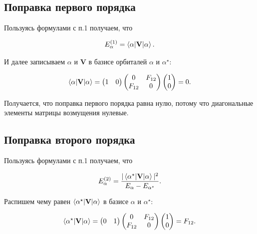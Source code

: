 \documentclass{article}
\begin{document}
\subsection{Поправка первого порядка}

Пользуясь формулами с п.1 получаем, что 

\begin{equation}
    E_{\alpha}^{(1)} = \braket{\alpha|\textbf{V}|\alpha}.
\end{equation}

И далее записываем $\alpha$ и $\textbf{V}$ в базисе орбиталей $\alpha$ и $\alpha^\star$:

\begin{equation}
    \braket{\alpha|\textbf{V}|\alpha} = 
    \begin{pmatrix}
        1 & 0
    \end{pmatrix}
    \begin{pmatrix}
        0 & F_{12} \\
        F_{12} & 0
    \end{pmatrix}
    \begin{pmatrix}
        1 \\
        0
    \end{pmatrix}
    = 0.
\end{equation}

Получается, что поправка первого порядка равна нулю, потому что диагональные элементы матрицы возмущения нулевые.

\subsection{Поправка второго порядка}

Пользуясь формулами с п.1 получаем, что 

\begin{equation}
    E_{\alpha}^{(2)} = \frac{|\braket{\alpha^{\star}|\textbf{V}|\alpha}|^2}{E_{\alpha} - E_{\alpha^{\star}}}.
\end{equation}

Распишем чему равен $\braket{\alpha^{\star}|\textbf{V}|\alpha}$ в базисе $\alpha$ и $\alpha^\star$:

\begin{equation}
    \braket{\alpha^{\star}|\textbf{V}|\alpha} = 
    \begin{pmatrix}
        0 & 1
    \end{pmatrix}
    \begin{pmatrix}
        0 & F_{12} \\
        F_{12} & 0
    \end{pmatrix}
    \begin{pmatrix}
        1 \\
        0
    \end{pmatrix}
    = F_{12}.
\end{equation}
\end{document}
